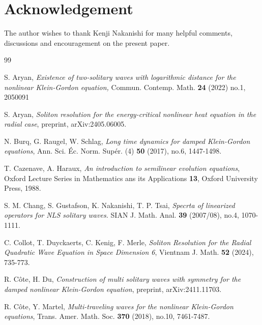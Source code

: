 \documentclass[reqno]{amsart}
\theoremstyle{plain}
\theoremstyle{definition}
\numberwithin{equation}{section}
\newcommand{\1}{\mathbbm{1}}
\begin{document}
\section*{Acknowledgement}

The author wishes to thank Kenji Nakanishi for many helpful comments, discussions and encouragement on the present paper. 


\begin{thebibliography}{99}
%
%

 S. Aryan,
\textit{Existence of two-solitary waves with logarithmic distance for the nonlinear Klein-Gordon equation,}
Commun. Contemp. Math. \textbf{24} (2022) no.1, 2050091


 S. Aryan,
\textit{Soliton resolution for the energy-critical nonlinear heat equation in the radial case},
preprint, arXiv:2405.06005.


 N. Burq, G. Raugel, W. Schlag,
\textit{Long time dynamics for damped Klein-Gordon equations},
Ann. Sci. \'{E}c. Norm. Sup\'{e}r. (4) \textbf{50} (2017), no.6, 1447-1498.




 T. Cazenave, A. Haraux, 
\textit{An introduction to semilinear evolution equations},
Oxford Lecture Series in Mathematics ans its Applications {\bf13}, Oxford University Press, 1988. 


 S. M. Chang, S. Gustafson, K. Nakanishi, T. P. Tsai,
\textit{Specrta of linearized operators for NLS solitary waves.}
SIAN J. Math. Anal. \textbf{39} (2007/08), no.4, 1070-1111.

 C. Collot, T. Duyckaerts, C. Kenig, F. Merle,
\textit{Soliton Resolution for the Radial Quadratic Wave Equation in Space Dimension 6},
Vientnam J. Math. \textbf{52} (2024), 735-773.

 R. C\^{o}te, H. Du,
\textit{Construction of multi solitary waves with symmetry for the damped nonlinear Klein-Gordon equation},
preprint, arXiv:2411.11703.




 R. C\^{o}te, Y. Martel,
\textit{Multi-traveling waves for the nonlinear Klein-Gordon equations},
Trans. Amer. Math. Soc. \textbf{370} (2018), no.10, 7461-7487.





\end{thebibliography}
\end{document}
